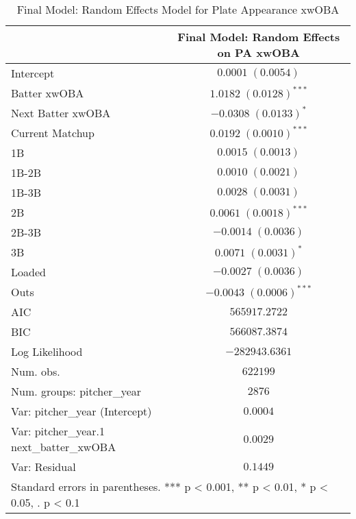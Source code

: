 
\begin{table}
\begin{center}
\begin{tabular}{l c}
\hline
 & Final Model: Random Effects on PA xwOBA \\
\hline
Intercept                                & $0.0001 \; (0.0054)$        \\
Batter xwOBA                             & $1.0182 \; (0.0128)^{***}$  \\
Next Batter xwOBA                        & $-0.0308 \; (0.0133)^{*}$   \\
Current Matchup                          & $0.0192 \; (0.0010)^{***}$  \\
1B                                       & $0.0015 \; (0.0013)$        \\
1B-2B                                    & $0.0010 \; (0.0021)$        \\
1B-3B                                    & $0.0028 \; (0.0031)$        \\
2B                                       & $0.0061 \; (0.0018)^{***}$  \\
2B-3B                                    & $-0.0014 \; (0.0036)$       \\
3B                                       & $0.0071 \; (0.0031)^{*}$    \\
Loaded                                   & $-0.0027 \; (0.0036)$       \\
Outs                                     & $-0.0043 \; (0.0006)^{***}$ \\
\hline
AIC                                      & $565917.2722$               \\
BIC                                      & $566087.3874$               \\
Log Likelihood                           & $-282943.6361$              \\
Num. obs.                                & $622199$                    \\
Num. groups: pitcher\_year               & $2876$                      \\
Var: pitcher\_year (Intercept)           & $0.0004$                    \\
Var: pitcher\_year.1 next\_batter\_xwOBA & $0.0029$                    \\
Var: Residual                            & $0.1449$                    \\
\hline
\multicolumn{2}{l}{\scriptsize{Standard errors in parentheses. *** p < 0.001, ** p < 0.01, * p < 0.05, . p < 0.1}}
\end{tabular}
\caption{Final Model: Random Effects Model for Plate Appearance xwOBA}
\label{table:coefficients}
\end{center}
\end{table}

